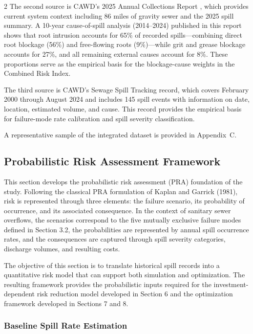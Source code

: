 \documentclass[10pt]{article}
\begin{document}
\begin{multicols}{2}
The second source is CAWD's 2025 Annual Collections Report
\citep{cawd2025}, which provides current system context including 86 miles
of gravity sewer and the 2025 spill summary. A 10-year cause-of-spill
analysis (2014--2024) published in this report shows that root intrusion
accounts for 65\% of recorded spills---combining direct root blockage
(56\%) and free-flowing roots (9\%)---while grit and grease blockage
accounts for 27\%, and all remaining external causes account for 8\%.
These proportions serve as the empirical basis for the blockage-cause
weights in the Combined Risk Index.
 
The third source is CAWD's Sewage Spill Tracking record, which covers
February 2000 through August 2024 and includes 145 spill events with
information on date, location, estimated volume, and cause. This record
provides the empirical basis for failure-mode rate calibration and
spill severity classification.
 
A representative sample of the integrated dataset is provided in
Appendix~C.
 
\subsection{Probabilistic Risk Assessment Framework}

This section develops the probabilistic risk assessment (PRA) foundation of the study. Following the classical PRA formulation of Kaplan and Garrick (1981), risk is represented through three elements: the failure scenario, its probability of occurrence, and its associated consequence. In the context of sanitary sewer overflows, the scenarios correspond to the five mutually exclusive failure modes defined in Section 3.2, the probabilities are represented by annual spill occurrence rates, and the consequences are captured through spill severity categories, discharge volumes, and resulting costs.

The objective of this section is to translate historical spill records into a quantitative risk model that can support both simulation and optimization. The resulting framework provides the probabilistic inputs required for the investment-dependent risk reduction model developed in Section 6 and the optimization framework developed in Sections 7 and 8.

\subsubsection{Baseline Spill Rate Estimation}


\end{multicols}
\end{document}
